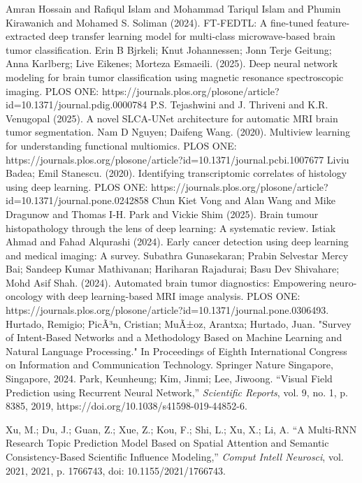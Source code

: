 \documentclass[runningheads]{llncs}
\begin{document}
\begin{thebibliography}{00}
     Amran Hossain and Rafiqul Islam and Mohammad Tariqul Islam and Phumin Kirawanich and Mohamed S. Soliman (2024). FT-FEDTL: A fine-tuned feature-extracted deep transfer learning model for multi-class microwave-based brain tumor classification.
 Erin B Bjrkeli; Knut Johannessen; Jonn Terje Geitung; Anna Karlberg; Live Eikenes; Morteza Esmaeili. (2025). Deep neural network modeling for brain tumor classification using magnetic resonance spectroscopic imaging. PLOS ONE: https://journals.plos.org/plosone/article?id=10.1371/journal.pdig.0000784
 P.S. Tejashwini and J. Thriveni and K.R. Venugopal (2025). A novel SLCA-UNet architecture for automatic MRI brain tumor segmentation.
 Nam D Nguyen; Daifeng Wang. (2020). Multiview learning for understanding functional multiomics. PLOS ONE: https://journals.plos.org/plosone/article?id=10.1371/journal.pcbi.1007677
 Liviu Badea; Emil Stanescu. (2020). Identifying transcriptomic correlates of histology using deep learning. PLOS ONE: https://journals.plos.org/plosone/article?id=10.1371/journal.pone.0242858
 Chun Kiet Vong and Alan Wang and Mike Dragunow and Thomas I-H. Park and Vickie Shim (2025). Brain tumour histopathology through the lens of deep learning: A systematic review.
 Istiak Ahmad and Fahad Alqurashi (2024). Early cancer detection using deep learning and medical imaging: A survey.
 Subathra Gunasekaran; Prabin Selvestar Mercy Bai; Sandeep Kumar Mathivanan; Hariharan Rajadurai; Basu Dev Shivahare; Mohd Asif Shah. (2024). Automated brain tumor diagnostics: Empowering neuro-oncology with deep learning-based MRI image analysis. PLOS ONE: https://journals.plos.org/plosone/article?id=10.1371/journal.pone.0306493.
    Hurtado, Remigio; PicÃ³n, Cristian; MuÃ±oz, Arantxa; Hurtado, Juan.
    "Survey of Intent-Based Networks and a Methodology Based on Machine Learning and Natural Language Processing."
    In Proceedings of Eighth International Congress on Information and Communication Technology.
    Springer Nature Singapore, Singapore, 2024.
    Park, Keunheung; Kim, Jinmi; Lee, Jiwoong. 
    ``Visual Field Prediction using Recurrent Neural Network,'' 
    \emph{Scientific Reports}, 
    vol. 9, no. 1, p. 8385, 
    2019, 
    https://doi.org/10.1038/s41598-019-44852-6.
    
    Xu, M.; Du, J.; Guan, Z.; Xue, Z.; Kou, F.; Shi, L.; Xu, X.; Li, A. 
    ``A Multi-RNN Research Topic Prediction Model Based on Spatial Attention and Semantic Consistency-Based Scientific Influence Modeling,'' 
    \emph{Comput Intell Neurosci}, 
    vol. 2021, 
    2021, 
    p. 1766743, 
    doi: 10.1155/2021/1766743.
    

\end{thebibliography}
\end{document}
